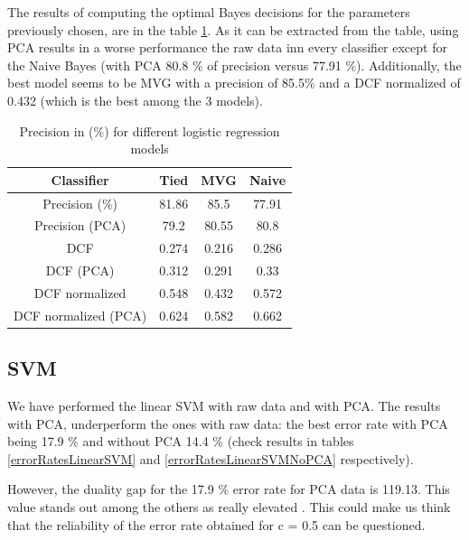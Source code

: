\documentclass[twoside,a4paper,12pt]{report}
\begin{document}
The results of computing the optimal Bayes decisions for the parameters previously chosen,
are in the table \ref{errorRatesConfusionMatrix}. As it can be extracted from the table,
using PCA results in a worse performance the raw data inn every classifier except for the
Naive Bayes (with PCA 80.8 \% of precision versus 77.91 \%). 
Additionally, the best model seems to be MVG with a precision of 85.5\% and a DCF normalized
of 0.432 (which is the best among the 3 models).


\begin{table}[H]
    \centering
     \begin{tabular}{||c c c c||} 
        \hline \hline
        Classifier & Tied & MVG  & Naive \\
        \hline\hline
        Precision (\%) &  81.86 & \cellcolor{blue!25}  85.5 & 77.91  \\ 
        \hline
        Precision (PCA)  &  79.2 &  80.55 & 80.8 \\ 
        \hline
        DCF &  0.274 &  0.216 & 0.286  \\   
        \hline
        DCF (PCA)  &  0.312 &  0.291 & 0.33  \\   
        \hline
        DCF normalized &  0.548 &\cellcolor{blue!25}  0.432 & 0.572  \\ 
        \hline
        DCF normalized (PCA)  &  0.624 &  0.582 & 0.662    \\ 
        \hline \hline
    \end{tabular}
    
    \caption{Precision in (\%) for different logistic regression models \label{errorRatesConfusionMatrix}}
\end{table}


\subsection{SVM}

We have performed the linear SVM with raw data and with PCA. The results
with PCA, underperform the ones with raw data: the best error rate with PCA being
17.9 \% and without PCA 14.4 \% (check results in tables \ref{errorRatesLinearSVM} and \ref{errorRatesLinearSVMNoPCA} respectively).

However, the duality gap for the 17.9 \% error rate for PCA data is 119.13. This
value stands out among the others as really elevated . This could make us think 
that the reliability of the error rate obtained for c = 0.5 can be questioned.
\end{document}
